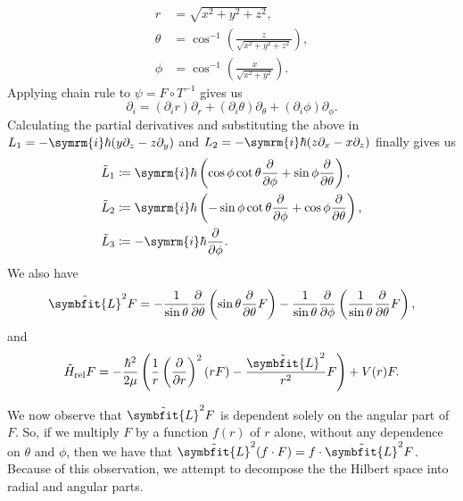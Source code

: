 \documentclass[12pt, a4 paper]{article}
\theoremstyle{definition}
\renewcommand{\i}{\symrm{i}}
\newcommand{\angsone}{\tilde{L}_1}
\newcommand{\angstwo}{\tilde{L}_2}
\newcommand{\angsthree}{\tilde{L}_3}
\newcommand{\lvecsquare}{\tilde{\symbfit{L}}^2}
\begin{document}
    \begin{align*}
        r      &= \sqrt{x^2 + y^2 + z^2},\\
        \theta &= \cos^{-1}{\left(\frac{z}{\sqrt{x^2 + y^2 + z^2}}\right)},\\
        \phi   &= \cos^{-1}{\left(\frac{x}{\sqrt{x^2 + y^2}}\right)}.
    \end{align*}
    Applying chain rule to $\psi = F \circ T^{-1}$ gives us
    \[
        \partial_i = (\partial_i r)\partial_r + (\partial_i \theta)\partial_\theta + (\partial_i \phi)\partial_\phi.
    \]
    Calculating the partial derivatives and substituting the above in $L_1 = -\i\hbar(y\partial_z - z\partial_y)$ and $L_2 = -\i\hbar(z\partial_x - x\partial_z)$ finally gives us
    \begin{align*}
        \angsone &\coloneq \i\hbar\left(\cos{\phi}\cot{\theta}\frac{\partial}{\partial\phi} + \sin{\phi}\frac{\partial}{\partial\theta}\right),\\
        \angstwo &\coloneq \i\hbar\left(-\sin{\phi}\cot{\theta}\frac{\partial}{\partial\phi} + \cos{\phi}\frac{\partial}{\partial\theta}\right),\\
        \angsthree &\coloneq -\i\hbar \frac{\partial}{\partial\phi}.
    \end{align*}
    We also have
    \[
        \lvecsquare F = -\frac{1}{\sin{\theta}}\frac{\partial}{\partial \theta}\left(\sin{\theta}\frac{\partial}{\partial\theta}F\right) -\frac{1}{\sin{\theta}}\frac{\partial}{\partial\phi}\left(\frac{1}{\sin{\theta}}\frac{\partial}{\partial\theta}F\right),
    \]
    and
    \[
        \tilde{H}_\text{rel} F = -\frac{\hbar^2}{2\mu}\left(\frac{1}{r}\left(\frac{\partial}{\partial r}\right)^2 (rF) - \frac{\lvecsquare}{r^2}F\right) + V(r)F.
    \]

    We now observe that $\lvecsquare F$ is dependent solely on the angular part of $F$. So, if we multiply $F$ by a function $f(r)$ of $r$ alone, without any dependence on $\theta$ and $\phi$, then we have that $\lvecsquare(f\cdot F) = f \cdot \lvecsquare F$. Because of this observation, we attempt to decompose the the Hilbert space into radial and angular parts.
\end{document}
